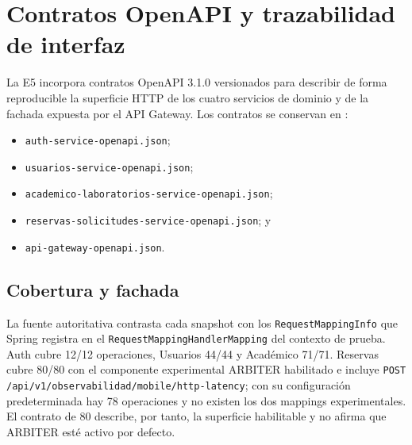 \section{Contratos OpenAPI y trazabilidad de interfaz}
\label{sec:contratos-openapi}

La E5 incorpora contratos OpenAPI 3.1.0 versionados para describir de forma
reproducible la superficie HTTP de los cuatro servicios de dominio y de la
fachada expuesta por el API Gateway. Los contratos se conservan en
:

\begin{itemize}
  \item \texttt{auth-service-openapi.json};
  \item \texttt{usuarios-service-openapi.json};
  \item \texttt{academico-laboratorios-service-openapi.json};
  \item \texttt{reservas-solicitudes-service-openapi.json}; y
  \item \texttt{api-gateway-openapi.json}.
\end{itemize}

\subsection{Cobertura y fachada}

La fuente autoritativa contrasta cada snapshot con los
\texttt{RequestMappingInfo} que Spring registra en el
\texttt{RequestMappingHandlerMapping} del contexto de prueba. Auth cubre 12/12
operaciones, Usuarios 44/44 y Académico 71/71. Reservas cubre 80/80 con el
componente experimental ARBITER habilitado e incluye
\texttt{POST /api/v1/observabilidad/mobile/http-latency}; con su configuración
predeterminada hay 78 operaciones y no existen los dos mappings experimentales.
El contrato de 80 describe, por tanto, la superficie habilitable y no afirma que
ARBITER esté activo por defecto.

